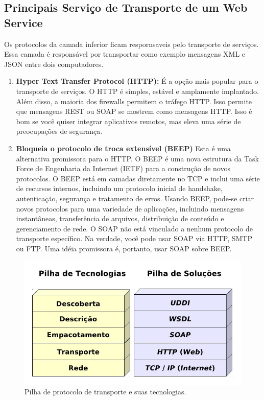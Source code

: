 \documentclass[12pt]{article}
\begin{document}
\subsection {Principais Serviço de Transporte de um Web Service}Os protocolos da camada inferior ficam respornsaveis pelo transporte de serviços. Essa camada é responsável por transportar como exemplo mensagens XML e JSON entre dois computadores.
\begin{enumerate}
	\item \textbf{Hyper Text Transfer Protocol (HTTP):}
	É a opção mais popular para o transporte de serviços. O HTTP é simples, estável e amplamente implantado. Além disso, a maioria dos firewalls permitem o tráfego HTTP. Isso permite que mensagens REST ou SOAP se mostrem como mensagens HTTP. Isso é bom se você quiser integrar aplicativos remotos, mas eleva uma série de preocupações de segurança.
	\item \textbf{Bloqueia o protocolo de troca extensível (BEEP)}
	Esta é uma alternativa promissora para o HTTP. O BEEP é uma nova estrutura da Task Force de Engenharia da Internet (IETF) para a construção de novos protocolos. O BEEP está em camadas diretamente no TCP e inclui uma série de recursos internos, incluindo um protocolo inicial de handshake, autenticação, segurança e tratamento de erros. Usando BEEP, pode-se criar novos protocolos para uma variedade de aplicações, incluindo mensagens instantâneas, transferência de arquivos, distribuição de conteúdo e gerenciamento de rede.
	O SOAP não está vinculado a nenhum protocolo de transporte específico. Na verdade, você pode usar SOAP via HTTP, SMTP ou FTP. Uma idéia promissora é, portanto, usar SOAP sobre BEEP.
\end{enumerate}
\begin{figure}[H]
	\centering
	\includegraphics[scale=0.5]{Imagens/pilhat.jpg}
	\caption{Pilha de protocolo de transporte e suas tecnologias. }
	\label{wbs}
\end{figure}
\end{document}
